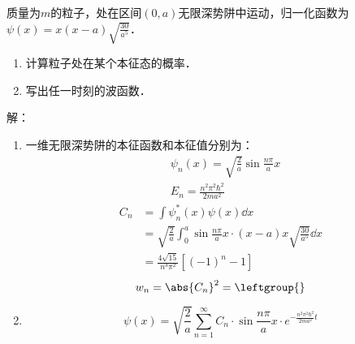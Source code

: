 \subsection{ }
质量为$m$的粒子，处在区间$(0,a)$无限深势阱中运动，归一化函数为$\psi(x)=x(x-a)\sqrt{\frac{30}{a^5}} $．
\begin{enumerate}
\item 计算粒子处在某个本征态的概率．
\item 写出任一时刻的波函数．
\end{enumerate}
解：
\begin{enumerate}
\item 一维无限深势阱的本征函数和本征值分别为：
\begin{align}
&\psi_n(x)=\sqrt{\frac{2}{a}}\sin{\frac{n\pi}{a}x}\\
&E_n=\frac{n^2\pi^2\hbar^2}{2ma^2}
\end{align}
\begin{equation}
\begin{aligned}
C_n &=\int\psi^{*}_{n}(x)\psi(x)\dd{x}\\
&=\sqrt{\frac{2}{a}}\int^{a}_{0}\sin{\frac{n\pi}{a}x}\cdot(x-a)x\sqrt{\frac{30}{a^5}}\dd{x}\\
&=\frac{4\sqrt{15}}{n^3\pi^2}[(-1)^n-1]
\end{aligned}
\end{equation}
\begin{equation}
w_n=\abs{C_n}^2=\leftgroup{}
\end{equation}
\item 
\begin{equation}
\psi(x)=\sqrt{\frac{2}{a}}\sum^{\infty}_{n=1}C_n\cdot\sin{\frac{n\pi}{a}x}\cdot e^{-\frac{n^2\pi^2\hbar^2}{2ma^2}t}
\end{equation}
\end{enumerate}
